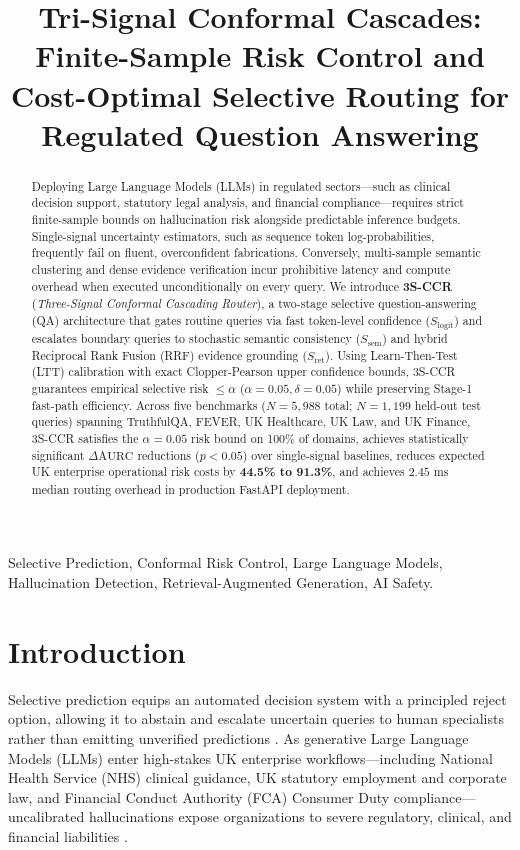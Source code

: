 \documentclass[10pt,conference]{IEEEtran}
\title{Tri-Signal Conformal Cascades: Finite-Sample Risk Control and Cost-Optimal Selective Routing for Regulated Question Answering}
\author{\IEEEauthorblockN{Nisarga}}
\begin{document}
\maketitle

\begin{abstract}
Deploying Large Language Models (LLMs) in regulated sectors—such as clinical decision support, statutory legal analysis, and financial compliance—requires strict finite-sample bounds on hallucination risk alongside predictable inference budgets. Single-signal uncertainty estimators, such as sequence token log-probabilities, frequently fail on fluent, overconfident fabrications. Conversely, multi-sample semantic clustering and dense evidence verification incur prohibitive latency and compute overhead when executed unconditionally on every query. We introduce \textbf{3S-CCR} (\emph{Three-Signal Conformal Cascading Router}), a two-stage selective question-answering (QA) architecture that gates routine queries via fast token-level confidence ($S_{\text{logit}}$) and escalates boundary queries to stochastic semantic consistency ($S_{\text{sem}}$) and hybrid Reciprocal Rank Fusion (RRF) evidence grounding ($S_{\text{ret}}$). Using Learn-Then-Test (LTT) calibration with exact Clopper-Pearson upper confidence bounds, 3S-CCR guarantees empirical selective risk $\le \alpha$ ($\alpha = 0.05, \delta = 0.05$) while preserving Stage-1 fast-path efficiency. Across five benchmarks ($N = 5,988$ total; $N = 1,199$ held-out test queries) spanning TruthfulQA, FEVER, UK Healthcare, UK Law, and UK Finance, 3S-CCR satisfies the $\alpha = 0.05$ risk bound on 100\% of domains, achieves statistically significant $\Delta\text{AURC}$ reductions ($p < 0.05$) over single-signal baselines, reduces expected UK enterprise operational risk costs by \textbf{44.5\% to 91.3\%}, and achieves $2.45\text{ ms}$ median routing overhead in production FastAPI deployment.
\end{abstract}

\begin{IEEEkeywords}
Selective Prediction, Conformal Risk Control, Large Language Models, Hallucination Detection, Retrieval-Augmented Generation, AI Safety.
\end{IEEEkeywords}

\section{Introduction}
Selective prediction equips an automated decision system with a principled reject option, allowing it to abstain and escalate uncertain queries to human specialists rather than emitting unverified predictions \cite{chow1970optimum,el2010foundations,geifman2017selective}. As generative Large Language Models (LLMs) enter high-stakes UK enterprise workflows—including National Health Service (NHS) clinical guidance, UK statutory employment and corporate law, and Financial Conduct Authority (FCA) Consumer Duty compliance—uncalibrated hallucinations expose organizations to severe regulatory, clinical, and financial liabilities \cite{ji2023survey,huang2023survey}.
\end{document}
